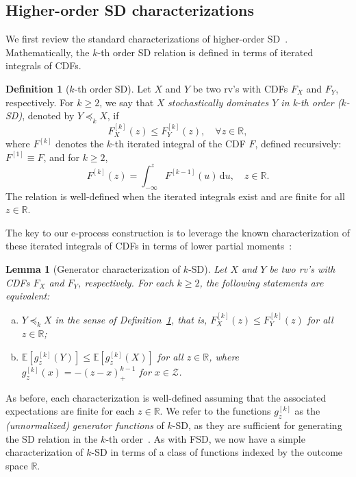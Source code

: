 \documentclass[12pt,twoside]{article}
\theoremstyle{plain}
\newtheorem{lemma}{Lemma}
\theoremstyle{definition}
\newtheorem{definition}{Definition}
\theoremstyle{remark}
\newcommand{\R}{\mathbb{R}}
\newcommand{\calZ}{\mathcal{Z}}
\newcommand{\Esymb}{\mathbb{E}}
\newcommand{\ksd}{\preceq_{k}}
\newcommand{\diff}{\,\mathrm{d}}
\begin{document}
\subsection{Higher-order SD characterizations}\label{sec:kSD}

We first review the standard characterizations of higher-order SD~\citep[e.g.,][]{shaked2007stochastic}.
Mathematically, the $k$-th order SD relation is defined in terms of iterated integrals of CDFs. 
\begin{definition}[$k$-th order SD]\label{def:kSD}
    Let $X$ and $Y$ be two rv's with CDFs $F_X$ and $F_Y$, respectively.
    For $k\geq 2$, we say that $X$ \emph{stochastically dominates $Y$ in k-th order ($k$-SD)}, denoted by $Y \ksd X$, if
    \begin{equation}\label{eq:ksd_definition}
        F_X^{[k]}(z) \leq F_Y^{[k]}(z), \quad \forall z \in \R,
    \end{equation}
    where $F^{[k]}$ denotes the $k$-th iterated integral of the CDF $F$, defined recursively: $F^{[1]} \equiv F$, and for $k\geq 2$,
    \begin{equation*}
        F^{[k]}(z) = \int_{-\infty}^z F^{[k-1]}(u)\diff u, \quad z\in \R.  
    \end{equation*}
    The relation is well-defined when the iterated integrals exist and are finite for all $z\in \R$. 
\end{definition}


The key to our e-process construction is to leverage the known characterization of these iterated integrals of CDFs in terms of lower partial moments~\citep[e.g.,][]{shaked2007stochastic}: 
\begin{lemma}[Generator characterization of $k$-SD]\label{lem:ksd_generator}
    Let $X$ and $Y$ be two rv's with CDFs $F_X$ and $F_Y$, respectively. For each $k\geq 2$, the following statements are equivalent:
    \begin{enumerate}[(a)]
        \item $Y \ksd X$ in the sense of Definition~\ref{def:kSD}, that is, $F_X^{[k]}(z) \leq F_Y^{[k]}(z)$ for all $z\in \R$;
        \item $\Esymb[g_z^{[k]}(Y)] \leq \Esymb[g_z^{[k]}(X)] $ for all $z \in \R$, where $g_z^{[k]}(x) = -(z - x)_+^{k-1}$ for $x\in \calZ$.\label{item_b:Lemma6}
    \end{enumerate}
\end{lemma}
As before, each characterization is well-defined assuming that the associated expectations are finite for each $z\in \R$. 
We refer to the functions $g_z^{[k]}$ as the \emph{(unnormalized) generator functions} of $k$-SD, as they are sufficient for generating the SD relation in the $k$-th order~\citep{marshall1991multivariate}. 
As with FSD, we now have a simple characterization of $k$-SD in terms of a class of functions indexed by the outcome space $\R$. 
\end{document}
